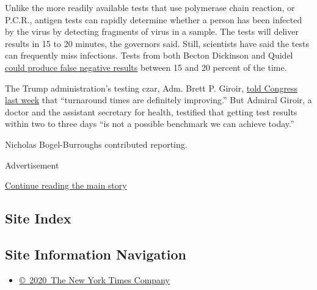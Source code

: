 Unlike the more readily available tests that use polymerase chain
reaction, or P.C.R., antigen tests can rapidly determine whether a
person has been infected by the virus by detecting fragments of virus in
a sample. The tests will deliver results in 15 to 20 minutes, the
governors said. Still, scientists have said the tests can frequently
miss infections. Tests from both Becton Dickinson and Quidel
\href{https://www.nytimes3xbfgragh.onion/2020/07/06/health/fast-coronavirus-tests.html}{could
produce false negative results} between 15 and 20 percent of the time.

The Trump administration's testing czar, Adm. Brett P. Giroir,
\href{https://www.nytimes3xbfgragh.onion/2020/07/31/us/politics/trump-coronavirus-testing.html}{told
Congress last week} that ``turnaround times are definitely improving.''
But Admiral Giroir, a doctor and the assistant secretary for health,
testified that getting test results within two to three days ``is not a
possible benchmark we can achieve today.''

Nicholas Bogel-Burroughs contributed reporting.

Advertisement

\protect\hyperlink{after-bottom}{Continue reading the main story}

\hypertarget{site-index}{%
\subsection{Site Index}\label{site-index}}

\hypertarget{site-information-navigation}{%
\subsection{Site Information
Navigation}\label{site-information-navigation}}

\begin{itemize}
\tightlist
\item
  \href{https://help.nytimes3xbfgragh.onion/hc/en-us/articles/115014792127-Copyright-notice}{©~2020~The
  New York Times Company}
\end{itemize}

